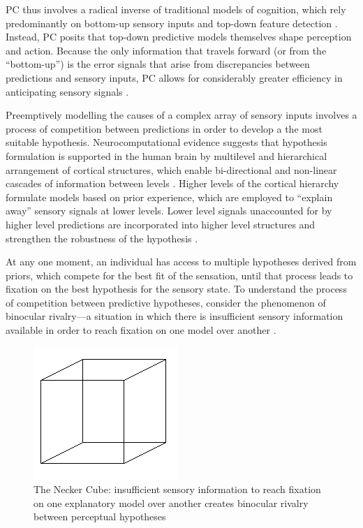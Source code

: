 \begin{CJK}{UTF8}{gbsn}
PC thus involves a radical inverse of traditional models of cognition, which rely predominantly on bottom-up sensory inputs and top-down feature detection \citep[e.g.,][]{Marr1985}. Instead, PC posits that top-down predictive models themselves shape perception and action.  Because the only information that travels forward (or from the ``bottom-up'') is the error signals that arise from discrepancies between predictions and sensory inputs, PC allows for considerably greater efficiency in anticipating sensory signals \citep[for a more detailed explanation of the PC paradigm, including its origins as a data compression strategy, see Appendix~\ref{app2:theory} Section ~\ref{app2:predictiveCoding}][]{Pickering2014}.

Preemptively modelling the causes of a complex array of sensory inputs involves a process of competition between predictions in order to develop a the most suitable hypothesis.  Neurocomputational evidence suggests that hypothesis formulation is supported in the human brain by multilevel and hierarchical arrangement of cortical structures, which enable bi-directional and non-linear cascades of information between levels \citep{Feldman2010}.  Higher levels of the cortical hierarchy formulate models based on prior experience, which are employed to ``explain away'' sensory signals at lower levels.  Lower level signals unaccounted for by higher level predictions are incorporated into higher level structures and strengthen the robustness of the hypothesis \citep{Clark2013}.

At any one moment, an individual has access to multiple hypotheses derived from priors, which compete for the best fit of the sensation, until that process leads to fixation on the best hypothesis for the sensory state.  To understand the process of competition between predictive hypotheses, consider the phenomenon of binocular rivalry---a situation in which there is insufficient sensory information available in order to reach fixation on one model over another \citep[for example, looking at a necker cube, see Figure ~\ref{fig:neckerCube}][]{Frith2007}.

\begin{figure}[htbp]
  \begin{center}
    \includegraphics[scale=.7]{images/Necker_cube.png}
      \caption{The Necker Cube: insufficient sensory information to reach fixation on one explanatory model over another creates binocular rivalry between perceptual hypotheses}
        \label{fig:neckerCube}
   \end{center}
\end{figure}


\end{CJK}
